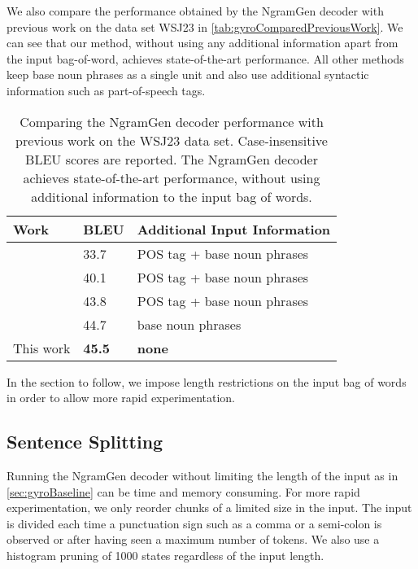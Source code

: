 We also compare the performance obtained by the NgramGen decoder with previous
work on the data set WSJ23 in \autoref{tab:gyroComparedPreviousWork}. We can
see that our method, without using any additional information apart from the
input bag-of-word, achieves state-of-the-art performance.
All other methods keep base noun phrases as a single unit and also use additional
syntactic information such as part-of-speech tags.
%
\begin{table}
\begin{center}
  \begin{tabular}{l|l|l}
    Work & BLEU & Additional Input Information \\
    \hline
    \citep{wan-dras-dale-paris:2009:EACL} & 33.7 & POS tag + base noun phrases\\
    \citep{zhang-clark:2011:EMNLP} & 40.1 & POS tag + base noun phrases \\
    \citep{zhang-blackwood-clark:2012:EACL2012} & 43.8 & POS tag + base noun phrases \\
    \citep{zhang:2013:IJCAI} & 44.7 & base noun phrases \\
    This work & \textbf{45.5} & \textbf{none}
  \end{tabular}
\end{center}
\caption{Comparing the NgramGen decoder performance with previous work
  on the WSJ23 data set. Case-insensitive BLEU scores are reported.
  The NgramGen decoder achieves state-of-the-art
  performance, without using additional information to the input bag of words.}
\label{tab:gyroComparedPreviousWork}
\end{table}

In the section to follow, we impose length restrictions on
the input bag of words in order to allow more rapid experimentation.

\subsection{Sentence Splitting}
\label{sec:sentenceSplitting}

Running the NgramGen decoder without limiting the length of the input
as in \autoref{sec:gyroBaseline} can be time and memory consuming.
For more rapid experimentation, we only reorder chunks of a limited
size in the
input. The input is divided each time a punctuation sign such
as a comma or a semi-colon is observed or after having seen a maximum
number of tokens. We also use a histogram pruning of 1000 states
regardless of the input length.

